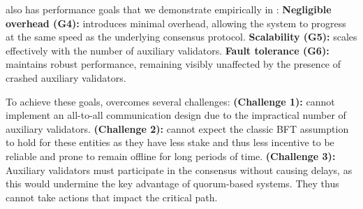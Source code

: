 \sysname also has performance goals that we demonstrate empirically in :
\textbf{Negligible overhead (G4):} \sysname introduces minimal overhead, allowing the system to progress at the same speed as the underlying consensus protocol.
\textbf{Scalability (G5):} \sysname scales effectively with the number of auxiliary validators.
\textbf{Fault tolerance (G6):} \sysname maintains robust performance, remaining visibly unaffected by the presence of crashed auxiliary validators.

To achieve these goals, \sysname overcomes several challenges:
\textbf{(Challenge 1):} \sysname cannot implement an all-to-all communication design due to the impractical number of auxiliary validators.
\textbf{(Challenge 2):} \sysname cannot expect the classic BFT assumption to hold for these entities as they have less stake and thus less incentive to be reliable and prone to remain offline for long periods of time.
\textbf{(Challenge 3):} Auxiliary validators must participate in the consensus without causing delays, as this would undermine the key advantage of quorum-based systems. They thus cannot take actions that impact the critical path.
